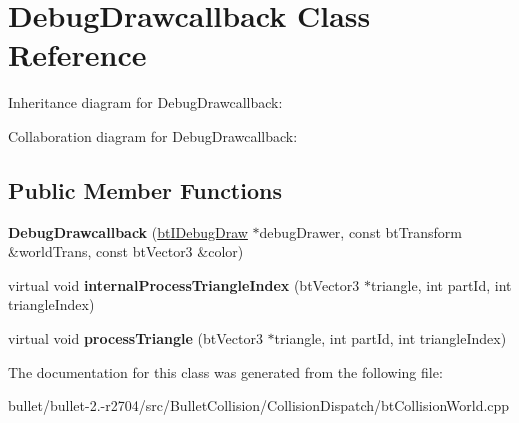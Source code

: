 \hypertarget{class_debug_drawcallback}{\section{Debug\+Drawcallback Class Reference}
\label{class_debug_drawcallback}
}


Inheritance diagram for Debug\+Drawcallback\+:


Collaboration diagram for Debug\+Drawcallback\+:
\subsection*{Public Member Functions}
\begin{DoxyCompactItemize}
\item 
\hypertarget{class_debug_drawcallback_a2124bd9a7f4f2b688ed41c31d2f271a3}{{\bfseries Debug\+Drawcallback} (\hyperlink{classbt_i_debug_draw}{bt\+I\+Debug\+Draw} $\ast$debug\+Drawer, const bt\+Transform \&world\+Trans, const bt\+Vector3 \&color)}\label{class_debug_drawcallback_a2124bd9a7f4f2b688ed41c31d2f271a3}

\item 
\hypertarget{class_debug_drawcallback_a01bb1ddb65580dd36fbf86c4183128de}{virtual void {\bfseries internal\+Process\+Triangle\+Index} (bt\+Vector3 $\ast$triangle, int part\+Id, int triangle\+Index)}\label{class_debug_drawcallback_a01bb1ddb65580dd36fbf86c4183128de}

\item 
\hypertarget{class_debug_drawcallback_a0b0801af46f9be0f0f99e43c6318d9fa}{virtual void {\bfseries process\+Triangle} (bt\+Vector3 $\ast$triangle, int part\+Id, int triangle\+Index)}\label{class_debug_drawcallback_a0b0801af46f9be0f0f99e43c6318d9fa}

\end{DoxyCompactItemize}


The documentation for this class was generated from the following file\+:\begin{DoxyCompactItemize}
\item 
bullet/bullet-\/2.-\/r2704/src/\+Bullet\+Collision/\+Collision\+Dispatch/bt\+Collision\+World.\+cpp\end{DoxyCompactItemize}
